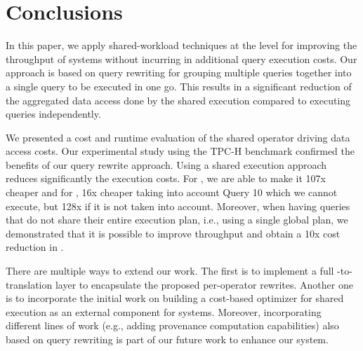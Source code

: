 \section{Conclusions}
\label{sec:conclusions}

In this paper, we apply shared-workload techniques at the \sql level for
improving the throughput of \qaasl systems without incurring in additional
query execution costs. Our approach is based on query rewriting for grouping
multiple queries together into a single query to be executed in one go. This
results in a significant reduction of the aggregated data access done by the
shared execution compared to executing queries independently.



We presented a cost and runtime evaluation of the shared operator driving data access costs. 
Our experimental study using the TPC-H benchmark confirmed the benefits of our
query rewrite approach. Using a shared execution approach reduces significantly
the execution costs. For \athena, we are able to make it 107x cheaper and for
\bigquery, 16x cheaper taking into account Query 10 which we cannot execute,
but 128x if it is not taken into account. Moreover, when having queries that do
not share their entire execution plan, i.e., using a single global plan, we
demonstrated that it is possible to improve throughput and obtain a 10x cost
reduction in \bigquery.


There are multiple ways to extend our work. The first is
to implement a full \sql-to-\sql translation layer to encapsulate the proposed
per-operator rewrites.  Another one is to incorporate the initial work on
building a cost-based optimizer for shared execution
\cite{Giannikis:2014:SWO:2732279.2732280} as an external component for \qaasl
systems.  Moreover, incorporating different lines of work (e.g., adding
provenance computation \cite{GA09} capabilities) also based on query
rewriting is part of our future work to enhance our system.
